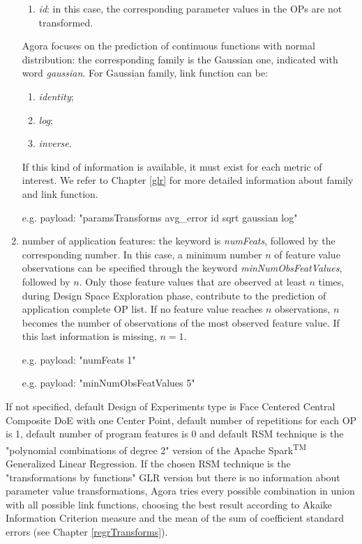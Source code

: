 \begin{enumerate}
\begin{enumerate}
        \item \textit{id}: in this case, the corresponding parameter values in the OPs are not transformed.
    
    \end{enumerate}
    
    Agora focuses on the prediction of continuous functions with normal distribution: the corresponding family is the Gaussian one, indicated with word \textit{gaussian}. For Gaussian family, link function can be:
    
    \begin{enumerate}
    
        \item \textit{identity};
        
        \item \textit{log};
        
        \item \textit{inverse}.
    
    \end{enumerate}
    
    If this kind of information is available, it must exist for each metric of interest. We refer to Chapter \ref{glr} for more detailed information about family and link function.
    
    e.g. payload: "paramsTransforms avg\_error id sqrt gaussian log"
    
    \item number of application features: the keyword is \textit{numFeats}, followed by the corresponding number. In this case, a minimum number $n$ of feature value observations can be specified through the keyword \textit{minNumObsFeatValues}, followed by $n$. Only those feature values that are observed at least $n$ times, during Design Space Exploration phase, contribute to the prediction of application complete OP list. If no feature value reaches $n$ observations, $n$ becomes the number of observations of the most observed feature value. If this last information is missing, $n = 1$.
    
    e.g. payload: "numFeats 1"
    
    e.g. payload: "minNumObsFeatValues 5"

\end{enumerate}

If not specified, default Design of Experiments type is Face Centered Central Composite DoE with one Center Point, default number of repetitions for each OP is 1, default number of program features is 0 and default RSM technique is the "polynomial combinations of degree 2" version of the Apache Spark\textsuperscript{TM} Generalized Linear Regression. If the chosen RSM technique is the "transformations by functions" GLR version but there is no information about parameter value transformations, Agora tries every possible combination in union with all possible link functions, choosing the best result according to Akaike Information Criterion measure and the mean of the sum of coefficient standard errors (see Chapter \ref{regrTransforms}).

